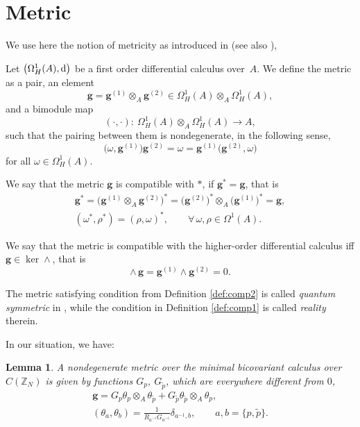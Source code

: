 \documentclass[10pt,a4paper]{amsart}
\numberwithin{equation}{section}
\newtheorem{Lemma}[Theorem]{Lemma}
\newcommand{\Z}{\mathbb{Z}}
\newcommand{\ip}{{\tilde{p}}}
\begin{document}
\section{Metric}
We use here the notion of metricity as introduced in \cite{BM14} (see also \cite{Si94}),
\begin{Definition}Let $\big(\Omega^1_H(A),{\rm d}\big)$ be a first order differential calculus over~$A$. We define the metric as a pair, an element
\[
\mathbf{g}=\mathbf{g}^{(1)}\otimes_A \mathbf{g}^{(2)}\in \Omega^1_H(A)\otimes_A\Omega^1_H(A),
\]
and a bimodule map
\[
(\cdot,\cdot)\colon \ \Omega^1_H(A)\otimes_A\Omega^1_H(A)\rightarrow A,
\] such that the pairing
between them is nondegenerate, in the following sense,
\begin{equation*}%
\big(\omega,\mathbf{g}^{(1)}\big)\mathbf{g}^{(2)}=\omega=\mathbf{g}^{(1)}\big(\mathbf{g}^{(2)},\omega\big)
\end{equation*}
for all $\omega\in\Omega^1_H(A)$.
\end{Definition}

\begin{Definition}\label{def:comp1}
We say that the metric $\mathbf{g}$ is compatible with $\ast$, if $\mathbf{g}^*=\mathbf{g}$, that is
\begin{gather*}
\mathbf{g}^\ast = \big( \mathbf{g}^{(1)}\otimes_A \mathbf{g}^{(2)} \big)^*
= \big(\mathbf{g}^{(2)}\big)^*\otimes_A \big(\mathbf{g}^{(1)}\big)^* = \mathbf{g}, \\
(\omega^*, \rho^*) = (\rho, \omega)^*, \qquad \forall\, \omega,\rho \in \Omega^1(A).
\end{gather*}
\end{Definition}
\begin{Definition}\label{def:comp2}
We say that the metric is compatible with the higher-order differential calculus iff
$\mathbf{g} \in \ker \wedge$, that is
\[ {\wedge}\, \mathbf{g} = \mathbf{g}^{(1)}\wedge \mathbf{g}^{(2)} = 0. \]
\end{Definition}

\begin{Remark}The metric satisfying condition from Definition \ref{def:comp2} is called {\it quantum symmetric} in \cite{BM14}, while the condition in Definition \ref{def:comp1} is called {\it reality} therein.
\end{Remark}

In our situation, we have:
\begin{Lemma}
\label{lemma_metric01}
A nondegenerate metric over the minimal bicovariant calculus over $C(\Z_N)$
is given by functions $G_p$, $G_\ip$, which are everywhere different from $0$,
\begin{gather}
 \mathbf{g} = G_p \theta_p \otimes_A \theta_\ip + G_\ip \theta_\ip \otimes_A \theta_p,\label{metric1} \\
 ( \theta_a,\theta_b)=\frac{1}{R_{a^{-1}} G_{a^{-1}}} \delta_{a^{-1},b} , \qquad a,b=\{p,\ip\}.\nonumber %
\end{gather}
\end{Lemma}
\end{document}
